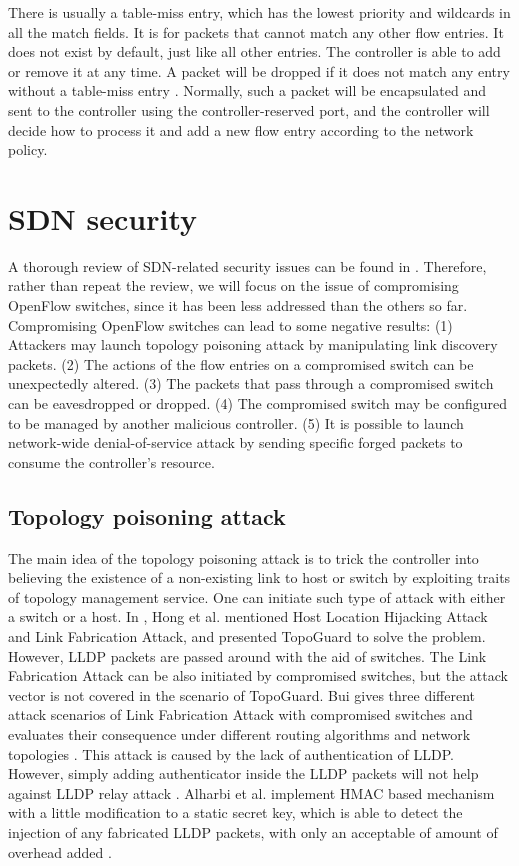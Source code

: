There is usually a table-miss entry, which has the lowest priority and wildcards in all the match fields. It is for packets that cannot match any other flow entries. It does not exist by default, just like all other entries. The controller is able to add or remove it at any time. A packet will be dropped if it does not match any entry without a table-miss entry \cite{OF_SPEC}. Normally, such a packet will be encapsulated and sent to the controller using the controller-reserved port, and the controller will decide how to process it and add a new flow entry according to the network policy. 

\section{SDN security}
\label{SDN security}
A thorough review of SDN-related security issues can be found in \cite{LAB14, CM, SOS13, KJK}. Therefore, rather than repeat the review, we will focus on the issue of compromising OpenFlow switches, since it has been less addressed than the others so far. Compromising OpenFlow switches can lead to some negative results: (1) Attackers may launch topology poisoning attack by manipulating link discovery packets. (2) The actions of the flow entries on a compromised switch can be unexpectedly altered. (3) The packets that pass through a compromised switch can be eavesdropped or dropped. (4) The compromised switch may be configured to be managed by another malicious controller. (5) It is possible to launch network-wide denial-of-service attack by sending specific forged packets to consume the controller's resource.

\subsection{Topology poisoning attack}
The main idea of the topology poisoning attack is to trick the controller into believing the existence of a non-existing link to host or switch by exploiting traits of topology management service. One can initiate such type of attack with either a switch or a host. In \cite{HXWG15}, Hong et al. mentioned Host Location Hijacking Attack and Link Fabrication Attack, and presented TopoGuard to solve the problem. However, LLDP packets are passed around with the aid of switches. The Link Fabrication Attack can be also initiated by compromised switches, but the attack vector  is not covered in the scenario of TopoGuard. Bui gives three different attack scenarios of Link Fabrication Attack with compromised switches and evaluates their consequence under different routing algorithms and network topologies \cite{TTB15}. This attack is caused by the lack of authentication of LLDP. However, simply adding authenticator inside the LLDP packets will not help against LLDP relay attack \cite{HXWG15}. Alharbi et al. implement HMAC based mechanism with a little modification to a static secret key, which is able to detect the injection of any fabricated LLDP packets, with only an acceptable of amount of overhead added \cite{ATPP15}.

